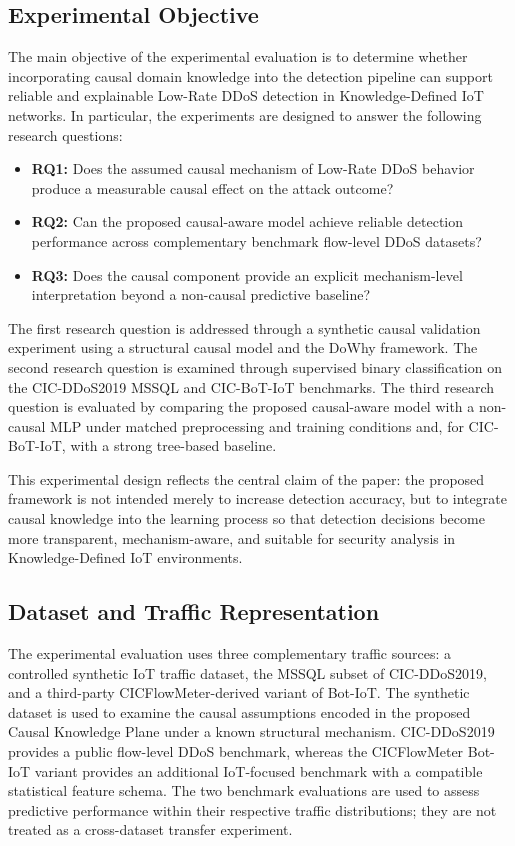 \documentclass[journal]{IEEEtran}
\begin{document}
\subsection{Experimental Objective}

The main objective of the experimental evaluation is to determine whether incorporating causal domain knowledge into the detection pipeline can support reliable and explainable Low-Rate DDoS detection in Knowledge-Defined IoT networks. In particular, the experiments are designed to answer the following research questions:

\begin{itemize}
  \item \textbf{RQ1:} Does the assumed causal mechanism of Low-Rate DDoS behavior produce a measurable causal effect on the attack outcome?
  \item \textbf{RQ2:} Can the proposed causal-aware model achieve reliable detection performance across complementary benchmark flow-level DDoS datasets?
  \item \textbf{RQ3:} Does the causal component provide an explicit mechanism-level interpretation beyond a non-causal predictive baseline?
\end{itemize}

The first research question is addressed through a synthetic causal
validation experiment using a structural causal model and the DoWhy
framework. The second research question is examined through supervised binary
classification on the CIC-DDoS2019 MSSQL and CIC-BoT-IoT benchmarks. The
third research question is evaluated by comparing the proposed causal-aware
model with a non-causal MLP under matched preprocessing and training
conditions and, for CIC-BoT-IoT, with a strong tree-based baseline.

This experimental design reflects the central claim of the paper: the proposed framework is not intended merely to increase detection accuracy, but to integrate causal knowledge into the learning process so that detection decisions become more transparent, mechanism-aware, and suitable for security analysis in Knowledge-Defined IoT environments.

\subsection{Dataset and Traffic Representation}

The experimental evaluation uses three complementary traffic sources: a
controlled synthetic IoT traffic dataset, the MSSQL subset of CIC-DDoS2019,
and a third-party CICFlowMeter-derived variant of Bot-IoT. The synthetic dataset is
used to examine the causal assumptions encoded in the proposed Causal
Knowledge Plane under a known structural mechanism. CIC-DDoS2019 provides a
public flow-level DDoS benchmark, whereas the CICFlowMeter Bot-IoT variant
provides an additional IoT-focused benchmark with a compatible statistical
feature schema. The two benchmark evaluations are used to assess predictive
performance within their respective traffic distributions; they are not
treated as a cross-dataset transfer experiment.
\end{document}

